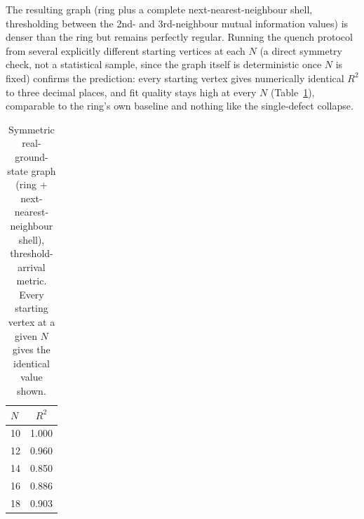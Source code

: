 \documentclass[11pt]{article}
\begin{document}
The resulting graph (ring plus a complete next-nearest-neighbour shell, thresholding between the 2nd- and 3rd-neighbour mutual information values) is denser than the ring but remains perfectly regular. Running the quench protocol from several explicitly different starting vertices at each $N$ (a direct symmetry check, not a statistical sample, since the graph itself is deterministic once $N$ is fixed) confirms the prediction: every starting vertex gives numerically identical $R^2$ to three decimal places, and fit quality stays high at every $N$ (Table~\ref{tab:symmetric}), comparable to the ring's own baseline and nothing like the single-defect collapse.

\begin{table}[h]
\centering
\caption{Symmetric real-ground-state graph (ring + next-nearest-neighbour shell), threshold-arrival metric. Every starting vertex at a given $N$ gives the identical value shown.}
\label{tab:symmetric}
\begin{tabular}{@{}lc@{}}
\toprule
$N$ & $R^2$ \\
\midrule
10 & 1.000 \\
12 & 0.960 \\
14 & 0.850 \\
16 & 0.886 \\
18 & 0.903 \\
\bottomrule
\end{tabular}
\end{table}
\end{document}
